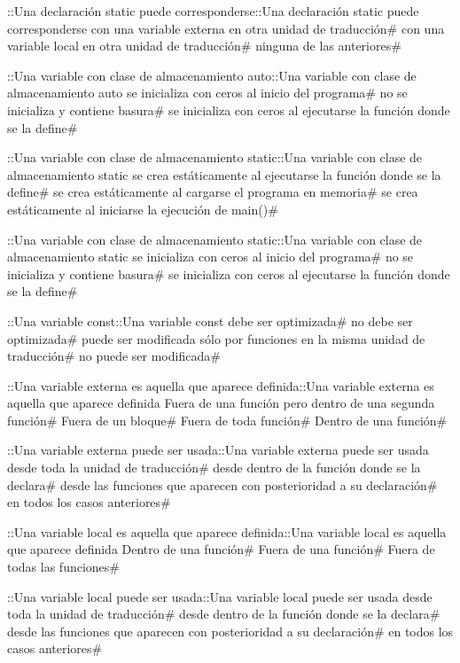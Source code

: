 {{{{{{{{{{{{{{\question ::Una declaración static puede corresponderse::Una declaración static puede corresponderse
\choice con una variable externa en otra unidad de traducción# 
\choice con una variable local en otra unidad de traducción# 
\correctchoice ninguna de las anteriores# 

\question ::Una variable con clase de almacenamiento auto::Una variable con clase de almacenamiento auto
\choice se inicializa con ceros al inicio del programa# 
\correctchoice no se inicializa y contiene basura# 
\choice se inicializa con ceros al ejecutarse la función donde se la define# 

\question ::Una variable con clase de almacenamiento static::Una variable con clase de almacenamiento static
\choice se crea estáticamente al ejecutarse la función donde se la define# 
\correctchoice se crea estáticamente al cargarse el programa en memoria# 
\choice se crea estáticamente al iniciarse la ejecución de main()# 

\question ::Una variable con clase de almacenamiento static::Una variable con clase de almacenamiento static
\correctchoice se inicializa con ceros al inicio del programa# 
\choice no se inicializa y contiene basura# 
\choice se inicializa con ceros al ejecutarse la función donde se la define# 

\question ::Una variable const::Una variable const
\choice debe ser optimizada# 
\choice no debe ser optimizada# 
\choice puede ser modificada sólo por funciones en la misma unidad de traducción# 
\correctchoice no puede ser modificada# 

\question ::Una variable externa es aquella que aparece definida::Una variable externa es aquella que aparece definida
\choice Fuera de una función pero dentro de una segunda función# 
\choice Fuera de un bloque# 
\correctchoice Fuera de toda función# 
\choice Dentro de una función# 

\question ::Una variable externa puede ser usada::Una variable externa puede ser usada
\choice desde toda la unidad de traducción# 
\choice desde dentro de la función donde se la declara# 
\correctchoice desde las funciones que aparecen con posterioridad a su declaración# 
\choice en todos los casos anteriores# 

\question ::Una variable local es aquella que aparece definida::Una variable local es aquella que aparece definida
\correctchoice Dentro de una función# 
\choice Fuera de una función# 
\choice Fuera de todas las funciones# 

\question ::Una variable local puede ser usada::Una variable local puede ser usada
\choice desde toda la unidad de traducción# 
\correctchoice desde dentro de la función donde se la declara# 
\choice desde las funciones que aparecen con posterioridad a su declaración# 
\choice en todos los casos anteriores# 

}}}}}}}}}}}}}}
